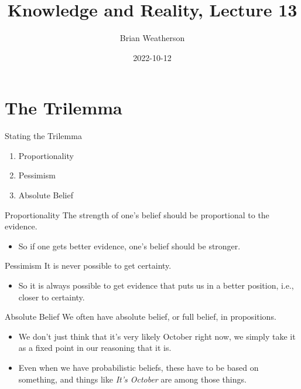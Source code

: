 \documentclass[
  17pt,
  letterpaper,
  ignorenonframetext,
  aspectratio=169,
]{beamer}
\title{Knowledge and Reality, Lecture 13}
\author{Brian Weatherson}
\date{2022-10-12}
\providecommand{\tightlist}{%
  \setlength{\itemsep}{0pt}\setlength{\parskip}{0pt}}\usepackage{longtable,booktabs,array}
\begin{document}
\frame{\titlepage}
\ifdefined\Shaded\renewenvironment{Shaded}{\begin{tcolorbox}[interior hidden, sharp corners, borderline west={3pt}{0pt}{shadecolor}, frame hidden, breakable, enhanced, boxrule=0pt]}{\end{tcolorbox}}\fi

\hypertarget{the-trilemma}{%
\section{The Trilemma}\label{the-trilemma}}

\begin{frame}{Stating the Trilemma}
\protect\hypertarget{stating-the-trilemma}{}
\begin{enumerate}[<+->]
\tightlist
\item
  Proportionality
\item
  Pessimism
\item
  Absolute Belief
\end{enumerate}
\end{frame}

\begin{frame}{Proportionality}
\protect\hypertarget{proportionality}{}
The strength of one's belief should be proportional to the evidence.

\begin{itemize}[<+->]
\tightlist
\item
  So if one gets better evidence, one's belief should be stronger.
\end{itemize}
\end{frame}

\begin{frame}{Pessimism}
\protect\hypertarget{pessimism}{}
It is never possible to get certainty.

\begin{itemize}[<+->]
\tightlist
\item
  So it is always possible to get evidence that puts us in a better
  position, i.e., closer to certainty.
\end{itemize}
\end{frame}

\begin{frame}{Absolute Belief}
\protect\hypertarget{absolute-belief}{}
We often have absolute belief, or full belief, in propositions.

\begin{itemize}[<+->]
\tightlist
\item
  We don't just think that it's very likely October right now, we simply
  take it as a fixed point in our reasoning that it is.
\item
  Even when we have probabilistic beliefs, these have to be based on
  something, and things like \emph{It's October} are among those things.
\end{itemize}
\end{frame}
\end{document}
